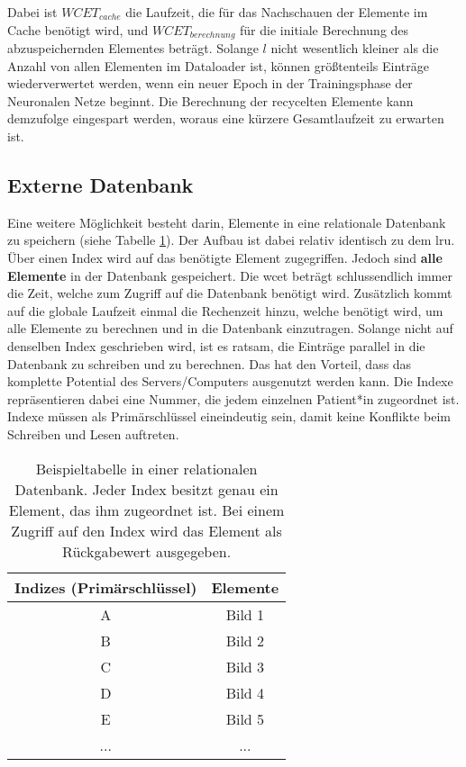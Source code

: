 Dabei ist $WCET_{cache}$ die Laufzeit, die für das Nachschauen der Elemente im Cache benötigt wird, und $WCET_{berechnung}$ für die initiale Berechnung des abzuspeichernden Elementes beträgt. Solange $l$ nicht wesentlich kleiner als die Anzahl von allen Elementen im Dataloader ist, können größtenteils Einträge wiederverwertet werden, wenn ein neuer Epoch in der Trainingsphase der Neuronalen Netze beginnt. Die Berechnung der recycelten Elemente kann demzufolge eingespart werden, woraus eine kürzere Gesamtlaufzeit zu erwarten ist.




\subsection{Externe Datenbank}\label{database}
Eine weitere Möglichkeit besteht darin, Elemente in eine relationale Datenbank zu speichern (siehe Tabelle \ref{cap:database}). Der Aufbau ist dabei relativ identisch zu dem \ac{lru}. Über einen Index wird auf das benötigte Element zugegriffen. Jedoch sind \textbf{alle Elemente} in der Datenbank gespeichert. Die \ac{wcet} beträgt schlussendlich immer die Zeit, welche zum Zugriff auf die Datenbank benötigt wird. Zusätzlich kommt auf die globale Laufzeit einmal die Rechenzeit hinzu, welche benötigt wird, um alle Elemente zu berechnen und in die Datenbank einzutragen. Solange nicht auf denselben Index geschrieben wird, ist es ratsam, die Einträge parallel in die Datenbank zu schreiben und zu berechnen. Das hat den Vorteil, dass das komplette Potential des Servers/Computers ausgenutzt werden kann. Die Indexe repräsentieren dabei eine Nummer, die jedem einzelnen Patient*in zugeordnet ist. Indexe müssen als Primärschlüssel eineindeutig sein, damit keine Konflikte beim Schreiben und Lesen auftreten.

\begin{table}[h]\vspace{1ex}\centering
  \begin{tabular*}{9cm}{c|c}
  \textbf{Indizes (Primärschlüssel)} & \textbf{Elemente}
  \\\hline
  A   &  Bild 1 \\
  B   &  Bild 2 \\
  C   &  Bild 3 \\
  D   &  Bild 4 \\
  E   &  Bild 5 \\
  ... & ...

  \\\hline
  \end{tabular*}
  \caption[Beispieltabelle einer relationalen Datenbank]{Beispieltabelle in einer relationalen Datenbank. Jeder Index besitzt genau ein Element, das ihm zugeordnet ist. Bei einem Zugriff auf den Index wird das Element als Rückgabewert ausgegeben.}\label{cap:database}
\vspace{2ex}\end{table}\label{table:database}


